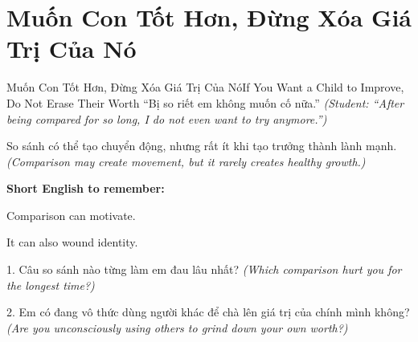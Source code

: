 \section{Muốn Con Tốt Hơn, Đừng Xóa Giá Trị Của Nó}
\begin{truyen}{Muốn Con Tốt Hơn, Đừng Xóa Giá Trị Của Nó}{If You Want a Child to Improve, Do Not Erase Their Worth}
 ``Bị so riết em không muốn cố nữa.''
\textit{(Student: ``After being compared for so long, I do not even want to try anymore.'')}

\end{truyen}

\begin{baihoc}
So sánh có thể tạo chuyển động, nhưng rất ít khi tạo trưởng thành lành mạnh.
\textit{(Comparison may create movement, but it rarely creates healthy growth.)}
\end{baihoc}

\begin{ghinhoanh}
\textbf{Short English to remember:}

Comparison can motivate.

It can also wound identity.
\end{ghinhoanh}

\begin{tuhocnhanh}
1. Câu so sánh nào từng làm em đau lâu nhất? \textit{(Which comparison hurt you for the longest time?)}

2. Em có đang vô thức dùng người khác để chà lên giá trị của chính mình không? \textit{(Are you unconsciously using others to grind down your own worth?)}
\end{tuhocnhanh}

\ngancach
